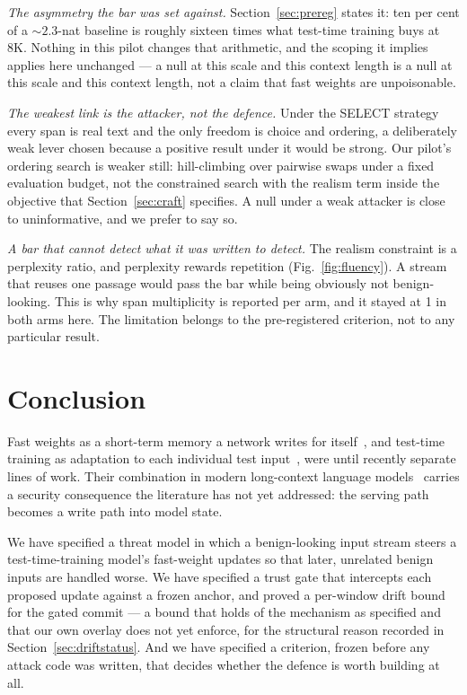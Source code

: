 \documentclass[journal]{IEEEtran}
\begin{document}
\textit{The asymmetry the bar was set against.} Section~\ref{sec:prereg} states
it: ten per cent of a ${\sim}2.3$-nat baseline is roughly sixteen times what
test-time training buys at 8K. Nothing in this pilot changes that arithmetic, and
the scoping it implies applies here unchanged --- a null at this scale and this
context length is a null at this scale and this context length, not a claim that
fast weights are unpoisonable.

\textit{The weakest link is the attacker, not the defence.} Under the SELECT
strategy every span is real text and the only freedom is choice and ordering, a
deliberately weak lever chosen because a positive result under it would be
strong. Our pilot's ordering search is weaker still: hill-climbing over pairwise
swaps under a fixed evaluation budget, not the constrained search with the
realism term inside the objective that Section~\ref{sec:craft} specifies. A null
under a weak attacker is close to uninformative, and we prefer to say so.

\textit{A bar that cannot detect what it was written to detect.} The realism
constraint is a perplexity ratio, and perplexity rewards repetition
(Fig.~\ref{fig:fluency}). A stream that reuses one passage would pass the bar
while being obviously not benign-looking. This is why span multiplicity is
reported per arm, and it stayed at 1 in both arms here. The limitation belongs to
the pre-registered criterion, not to any particular result.

\section{Conclusion}
\label{sec:conclusion}

Fast weights as a short-term memory a network writes for
itself~\cite{ba2016fastweights}, and test-time training as adaptation to each
individual test input~\cite{sun2020ttt}, were until recently separate lines of
work. Their combination in modern long-context language
models~\cite{sun2024tttlayers,tandon2025tttE2E} carries a security consequence
the literature has not yet addressed: the serving path becomes a write path into
model state.

We have specified a threat model in which a benign-looking input stream steers a
test-time-training model's fast-weight updates so that later, unrelated benign
inputs are handled worse. We have specified a trust gate that intercepts each
proposed update against a frozen anchor, and proved a per-window drift bound for
the gated commit --- a bound that holds of the mechanism as specified and that our
own overlay does not yet enforce, for the structural reason recorded in
Section~\ref{sec:driftstatus}. And we have specified a criterion, frozen before
any attack code was written, that decides whether the defence is worth building at
all.
\end{document}

